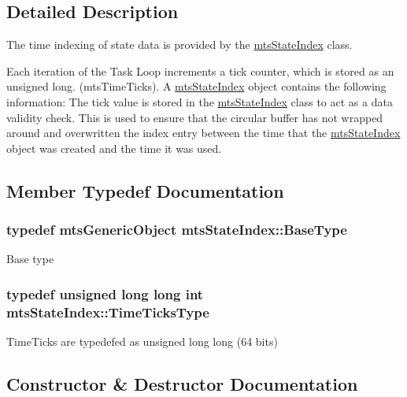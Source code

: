 \subsection{Detailed Description}
The time indexing of state data is provided by the \hyperlink{classmts_state_index}{mts\+State\+Index} class.

Each iteration of the Task Loop increments a tick counter, which is stored as an unsigned long. (mts\+Time\+Ticks). A \hyperlink{classmts_state_index}{mts\+State\+Index} object contains the following information\+: The tick value is stored in the \hyperlink{classmts_state_index}{mts\+State\+Index} class to act as a data validity check. This is used to ensure that the circular buffer has not wrapped around and overwritten the index entry between the time that the \hyperlink{classmts_state_index}{mts\+State\+Index} object was created and the time it was used. 

\subsection{Member Typedef Documentation}
\hypertarget{classmts_state_index_a9b228c6cd3d48921c5253fd6b1a95800}{}
\subsubsection[{Base\+Type}]{\setlength{\rightskip}{0pt plus 5cm}typedef {\bf mts\+Generic\+Object} {\bf mts\+State\+Index\+::\+Base\+Type}}\label{classmts_state_index_a9b228c6cd3d48921c5253fd6b1a95800}
Base type \hypertarget{classmts_state_index_a80d0a5acdec3b616347ddea2912b6294}{}
\subsubsection[{Time\+Ticks\+Type}]{\setlength{\rightskip}{0pt plus 5cm}typedef unsigned long long int {\bf mts\+State\+Index\+::\+Time\+Ticks\+Type}}\label{classmts_state_index_a80d0a5acdec3b616347ddea2912b6294}
Time\+Ticks are typedef\textquotesingle{}ed as unsigned long long (64 bits) 

\subsection{Constructor \& Destructor Documentation}
\hypertarget{classmts_state_index_aef0bef10b969db03fa40817c316227f5}{}
